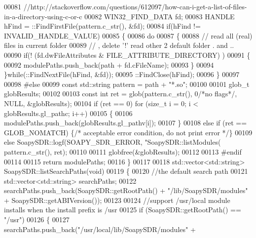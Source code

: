 \begin{DoxyCode}
00081     \textcolor{comment}{//http://stackoverflow.com/questions/612097/how-can-i-get-a-list-of-files-in-a-directory-using-c-or-c}
00082     WIN32\_FIND\_DATA fd; 
00083     HANDLE hFind = ::FindFirstFile(pattern.c\_str(), &fd); 
00084     \textcolor{keywordflow}{if}(hFind != INVALID\_HANDLE\_VALUE) 
00085     \{ 
00086         \textcolor{keywordflow}{do} 
00087         \{ 
00088             \textcolor{comment}{// read all (real) files in current folder}
00089             \textcolor{comment}{// , delete '!' read other 2 default folder . and ..}
00090             \textcolor{keywordflow}{if}(! (fd.dwFileAttributes & FILE\_ATTRIBUTE\_DIRECTORY) ) 
00091             \{
00092                 modulePaths.push\_back(path + fd.cFileName);
00093             \}
00094         \}\textcolor{keywordflow}{while}(::FindNextFile(hFind, &fd)); 
00095         ::FindClose(hFind); 
00096     \}
00097 
00098 \textcolor{preprocessor}{#else}
00099     \textcolor{keyword}{const} std::string pattern = path + \textcolor{stringliteral}{"*.so"};
00100 
00101     glob\_t globResults;
00102 
00103     \textcolor{keyword}{const} \textcolor{keywordtype}{int} ret = glob(pattern.c\_str(), 0\textcolor{comment}{/*no flags*/}, NULL, &globResults);
00104     \textcolor{keywordflow}{if} (ret == 0) \textcolor{keywordflow}{for} (\textcolor{keywordtype}{size\_t} i = 0; i < globResults.gl\_pathc; i++)
00105     \{
00106         modulePaths.push\_back(globResults.gl\_pathv[i]);
00107     \}
00108     \textcolor{keywordflow}{else} \textcolor{keywordflow}{if} (ret == GLOB\_NOMATCH) \{\textcolor{comment}{/* acceptable error condition, do not print error */}\}
00109     \textcolor{keywordflow}{else} SoapySDR::logf(SOAPY_SDR_ERROR, \textcolor{stringliteral}{"SoapySDR::listModules(%
      pattern.c\_str(), ret);
00110 
00111     globfree(&globResults);
00112 
00113 \textcolor{preprocessor}{#endif}
00114 
00115     \textcolor{keywordflow}{return} modulePaths;
00116 \}
00117 
00118 std::vector<std::string> SoapySDR::listSearchPaths(\textcolor{keywordtype}{void})
00119 \{
00120     \textcolor{comment}{//the default search path}
00121     std::vector<std::string> searchPaths;
00122     searchPaths.push\_back(SoapySDR::getRootPath() + \textcolor{stringliteral}{"/lib/SoapySDR/modules"} + 
      SoapySDR::getABIVersion());
00123 
00124     \textcolor{comment}{//support /usr/local module installs when the install prefix is /usr}
00125     \textcolor{keywordflow}{if} (SoapySDR::getRootPath() == \textcolor{stringliteral}{"/usr"})
00126     \{
00127         searchPaths.push\_back(\textcolor{stringliteral}{"/usr/local/lib/SoapySDR/modules"} + 
}
\end{DoxyCode}
